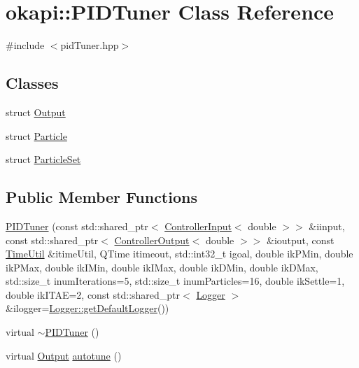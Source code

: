 \hypertarget{classokapi_1_1PIDTuner}{}\section{okapi\+::P\+I\+D\+Tuner Class Reference}
\label{classokapi_1_1PIDTuner}


{\ttfamily \#include $<$pid\+Tuner.\+hpp$>$}

\subsection*{Classes}
\begin{DoxyCompactItemize}
\item 
struct \mbox{\hyperlink{structokapi_1_1PIDTuner_1_1Output}{Output}}
\item 
struct \mbox{\hyperlink{structokapi_1_1PIDTuner_1_1Particle}{Particle}}
\item 
struct \mbox{\hyperlink{structokapi_1_1PIDTuner_1_1ParticleSet}{Particle\+Set}}
\end{DoxyCompactItemize}
\subsection*{Public Member Functions}
\begin{DoxyCompactItemize}
\item 
\mbox{\hyperlink{classokapi_1_1PIDTuner_a44dc4eed9bb29fd51a18bb97f8fde038}{P\+I\+D\+Tuner}} (const std\+::shared\+\_\+ptr$<$ \mbox{\hyperlink{classokapi_1_1ControllerInput}{Controller\+Input}}$<$ double $>$$>$ \&iinput, const std\+::shared\+\_\+ptr$<$ \mbox{\hyperlink{classokapi_1_1ControllerOutput}{Controller\+Output}}$<$ double $>$$>$ \&ioutput, const \mbox{\hyperlink{classokapi_1_1TimeUtil}{Time\+Util}} \&itime\+Util, Q\+Time itimeout, std\+::int32\+\_\+t igoal, double ik\+P\+Min, double ik\+P\+Max, double ik\+I\+Min, double ik\+I\+Max, double ik\+D\+Min, double ik\+D\+Max, std\+::size\+\_\+t inum\+Iterations=5, std\+::size\+\_\+t inum\+Particles=16, double ik\+Settle=1, double ik\+I\+T\+AE=2, const std\+::shared\+\_\+ptr$<$ \mbox{\hyperlink{classokapi_1_1Logger}{Logger}} $>$ \&ilogger=\mbox{\hyperlink{classokapi_1_1Logger_a5053cf778b4b55acba788a3797dc96d2}{Logger\+::get\+Default\+Logger}}())
\item 
virtual \mbox{\hyperlink{classokapi_1_1PIDTuner_a7583fde6cec427e875f75dc33e2bf00f}{$\sim$\+P\+I\+D\+Tuner}} ()
\item 
virtual \mbox{\hyperlink{structokapi_1_1PIDTuner_1_1Output}{Output}} \mbox{\hyperlink{classokapi_1_1PIDTuner_af67c498c38c49118876d592bb54a251d}{autotune}} ()
\end{DoxyCompactItemize}
